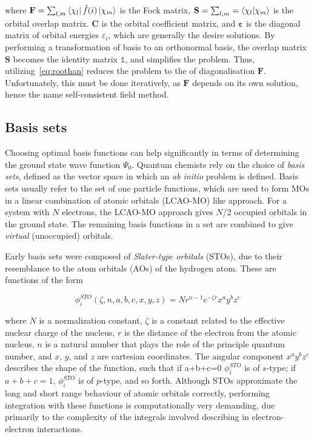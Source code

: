 \noindent where $\mathbf{F} = \sum_{l,m} \bra{\chi_l} \hat{f}(i) \ket{\chi_m}$
is the Fock matrix, $\mathbf{S} = \sum_{l,m} = \bra{\chi_l}\ket{\chi_m}$ is the
orbital overlap matrix. $\mathbf{C}$ is the orbital coefficient matrix, and
$\mathbf{\varepsilon}$ is the diagonal matrix of orbital energies
$\varepsilon_i$, which are generally the desire solutions. By performing a
transformation of basis to an orthonormal basis, the overlap matrix
$\mathbf{S}$ becomes the identity matrix $\mathbb{1}$, and simplifies the
problem. Thus, utilizing~\ref{eq:roothan} reduces the problem to the of
diagonalisation $\mathbf{F}$. Unfortunately, this must be done iteratively, as
$\mathbf{F}$ depends on its own solution, hence the name self-consistent field
method.

\subsection{Basis sets}

Choosing optimal basis functions can help significantly in terms of determining
the ground state wave function $\Psi_0$. Quantum chemists rely on the choice of
\emph{basis sets}, defined as the vector space in which an \emph{ab initio}
problem is defined. Basis sets usually refer to the set of one particle
functions, which are used to form MOs in a linear combination of atomic
orbitals (LCAO-MO) like approach. For a system with $N$ electrons, the LCAO-MO
approach gives $N$/2 occupied orbitals in the ground state. The remaining basis
functions in a set are combined to give \emph{virtual} (unoccupied) orbitals.

Early basis sets were composed of \emph{Slater-type orbitals} (STOs), due to
their resemblance to the atom orbitals (AOs) of the hydrogen atom. These are
functions of the form

\begin{equation}
\phi_i^{STO}(\zeta,n,a,b,c,x,y,z) = Nr^{n-1}e^{-\zeta r}x^a y^b z^c
\end{equation}

\noindent where $N$ is a normalization constant, $\zeta$ is a constant related
to the effective nuclear charge of the nucleus, $r$ is the distance of the
electron from the atomic nucleus, $n$ is a natural number that plays the role
of the principle quantum number, and $x$, $y$, and $z$ are cartesian
coordinates. The angular component $x^a y^b z^c$ describes the shape of the
function, such that if a+b+c=0 $\phi_i^{STO}$ is of $s$-type; if $a+b+c=1$,
$\phi_i^{STO}$ is of $p$-type, and so forth. Although STOs approximate the long
and short range behaviour of atomic orbitals correctly, performing integration
with these functions is computationally very demanding, due primarily to the
complexity of the integrals involved describing in electron-electron
interactions.

